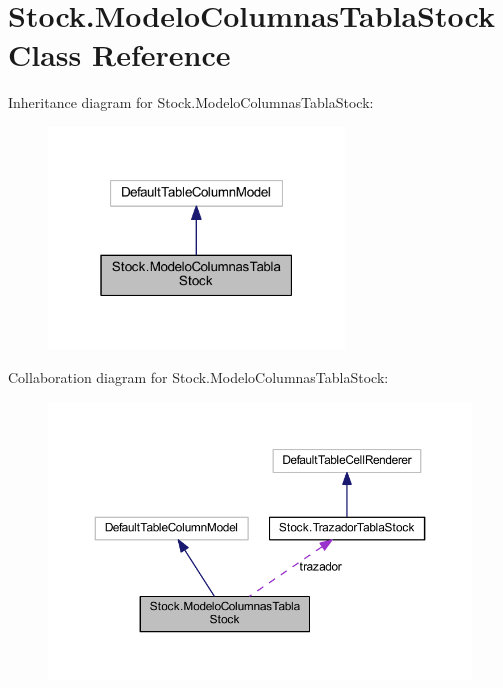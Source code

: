 \hypertarget{class_stock_1_1_modelo_columnas_tabla_stock}{}\section{Stock.\+Modelo\+Columnas\+Tabla\+Stock Class Reference}
\label{class_stock_1_1_modelo_columnas_tabla_stock}


Inheritance diagram for Stock.\+Modelo\+Columnas\+Tabla\+Stock\+:
\nopagebreak
\begin{figure}[H]
\begin{center}
\leavevmode
\includegraphics[width=223pt]{class_stock_1_1_modelo_columnas_tabla_stock__inherit__graph}
\end{center}
\end{figure}


Collaboration diagram for Stock.\+Modelo\+Columnas\+Tabla\+Stock\+:
\nopagebreak
\begin{figure}[H]
\begin{center}
\leavevmode
\includegraphics[width=350pt]{class_stock_1_1_modelo_columnas_tabla_stock__coll__graph}
\end{center}
\end{figure}
